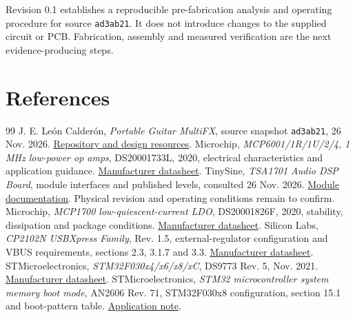 \documentclass[a4paper,10pt]{article}
\newcommand{\net}[1]{\texttt{#1}}
\begin{document}
Revision 0.1 establishes a reproducible pre-fabrication analysis and operating procedure for source \net{ad3ab21}. It does not introduce changes to the supplied circuit or PCB. Fabrication, assembly and measured verification are the next evidence-producing steps.

\clearpage
\section*{References}
\begingroup\small
\renewcommand{\refname}{}
\vspace{-7mm}
\begin{thebibliography}{99}
 J. E. León Calderón, \emph{Portable Guitar MultiFX}, source snapshot \net{ad3ab21}, 26 Nov. 2026. \href{https://github.com/SlLeonn/MultiFx_Project/tree/ad3ab214415b7b048fcca606c6cc5987dbe40415}{Repository and design resources}.
 Microchip, \emph{MCP6001/1R/1U/2/4, 1 MHz low-power op amps}, DS20001733L, 2020, electrical characteristics and application guidance. \href{https://ww1.microchip.com/downloads/aemDocuments/documents/MSLD/ProductDocuments/DataSheets/MCP6001-1R-1U-2-4-1-MHz-Low-Power-Op-Amp-DS20001733L.pdf}{Manufacturer datasheet}.
 TinySine, \emph{TSA1701 Audio DSP Board}, module interfaces and published levels, consulted 26 Nov. 2026. \href{https://www.tinysineaudio.com/products/tsa1701-audio-dsp-board}{Module documentation}. Physical revision and operating conditions remain to confirm.
 Microchip, \emph{MCP1700 low-quiescent-current LDO}, DS20001826F, 2020, stability, dissipation and package conditions. \href{https://ww1.microchip.com/downloads/aemDocuments/documents/APID/ProductDocuments/DataSheets/MCP1700-Data-Sheet-20001826F.pdf}{Manufacturer datasheet}.
 Silicon Labs, \emph{CP2102N USBXpress Family}, Rev. 1.5, external-regulator configuration and VBUS requirements, sections 2.3, 3.1.7 and 3.3. \href{https://www.silabs.com/documents/public/data-sheets/cp2102n-datasheet.pdf}{Manufacturer datasheet}.
 STMicroelectronics, \emph{STM32F030x4/x6/x8/xC}, DS9773 Rev. 5, Nov. 2021. \href{https://www.st.com/resource/en/datasheet/stm32f030c8.pdf}{Manufacturer datasheet}.
 STMicroelectronics, \emph{STM32 microcontroller system memory boot mode}, AN2606 Rev. 71, STM32F030x8 configuration, section 15.1 and boot-pattern table. \href{https://www.st.com/resource/en/application_note/an2606-introduction-to-system-memory-boot-mode-stmicroelectronics.pdf}{Application note}.

\end{thebibliography}
\end{document}
